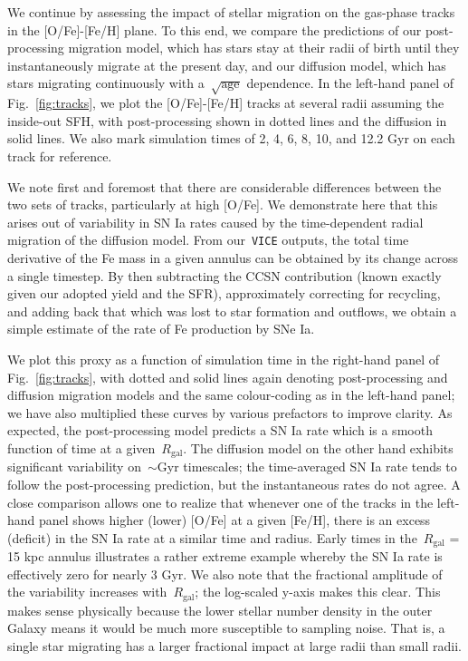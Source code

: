 \documentclass[fleqn, usenatbib]{mnras}
\begin{document}
We continue by assessing the impact of stellar migration on the gas-phase 
tracks in the [O/Fe]-[Fe/H] plane. To this end, we compare the predictions of 
our post-processing migration model, which has stars stay at their radii of 
birth until they instantaneously migrate at the present day, and our diffusion 
model, which has stars migrating continuously with a~$\sqrt{\text{age}}$ 
dependence. In the left-hand panel of Fig.~\ref{fig:tracks}, we plot the 
[O/Fe]-[Fe/H] tracks at several radii assuming the inside-out 
SFH, with post-processing shown in dotted lines and the diffusion in solid 
lines. We also mark simulation times of 2, 4, 6, 8, 10, and 12.2 Gyr on each 
track for reference. 
\par 
We note first and foremost that there are considerable differences between the 
two sets of tracks, particularly at high [O/Fe]. We demonstrate here that this 
arises out of variability in SN Ia rates caused by the time-dependent radial 
migration of the diffusion model. From our~\texttt{VICE} outputs, the total 
time derivative of the Fe mass in a given annulus can be obtained by its change 
across a single timestep. By then subtracting the CCSN contribution (known 
exactly given our adopted yield and the SFR), approximately correcting for 
recycling, and adding back that which was lost to star formation and outflows, 
we obtain a simple estimate of the rate of Fe production by SNe Ia. 
\par 
We plot this proxy as a function of simulation time in the right-hand panel of 
Fig.~\ref{fig:tracks}, with dotted and solid lines again denoting 
post-processing and diffusion migration models and the same colour-coding as in 
the left-hand panel; we have also multiplied these curves by various prefactors 
to improve clarity. As expected, the post-processing model predicts a SN Ia 
rate which is a smooth function of time at a given~$R_\text{gal}$. The diffusion 
model on the other hand exhibits significant variability on~$\sim$Gyr 
timescales; the time-averaged SN Ia rate tends to follow the post-processing 
prediction, but the instantaneous rates do not agree. A close comparison allows 
one to realize that whenever one of the tracks in the left-hand panel shows 
higher (lower) [O/Fe] at a given [Fe/H], there is an excess (deficit) in the SN 
Ia rate at a similar time and radius. Early times in the~$R_\text{gal}$ = 15 
kpc annulus illustrates a rather extreme example whereby the SN Ia rate is 
effectively zero for nearly 3 Gyr. We also note that the fractional amplitude 
of the variability increases with~$R_\text{gal}$; the log-scaled y-axis makes 
this clear. This makes sense physically because the lower stellar number 
density in the outer Galaxy means it would be much more susceptible to sampling 
noise. That is, a single star migrating has a larger fractional impact at 
large radii than small radii. 
\end{document}
